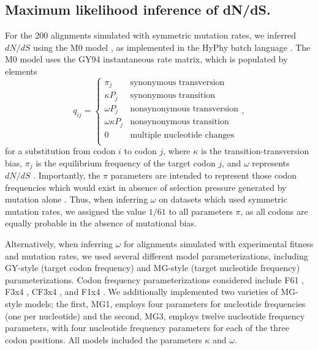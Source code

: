 \documentclass[11pt]{article}
\begin{document}
\subsection*{Maximum likelihood inference of dN/dS.}
For the 200 alignments simulated with symmetric mutation rates, we inferred $dN/dS$ using the M0 model \cite{Yangetal2000}, as implemented in the HyPhy batch language \cite{KosakovskyPondetal2005}. The M0 model uses the GY94 instantaneous rate matrix, which is populated by elements
\begin{equation}\label{eq:GY94}
q_{ij} = \left\{ 
	\begin{array}{rl}
	\pi_j                &\mbox{synonymous transversion} \\
	\kappa P_j           &\mbox{synonymous transition} \\
 	\omega P_j           &\mbox{nonsynonymous transversion} \\
 	\omega \kappa P_j    &\mbox{nonsynonymous transition} \\
	0                    &\mbox{multiple nucleotide changes} \\             
	\end{array} \right.,
\end{equation} for a substitution from codon $i$ to codon $j$, where $\kappa$ is the transition-transversion bias, $\pi_j$ is the equilibrium frequency of the target codon $j$, and $\omega$ represents $dN/dS$ \cite{GoldmanYang1994,NielsenYang1998}. Importantly, the $\pi$ parameters are intended to represent those codon frequencies which would exist in absence of selection pressure generated by mutation alone \cite{GoldmanYang1994,MuseGaut1994,YN00,Yang2006}. Thus, when inferring $\omega$ on datasets which used symmetric mutation rates, we assigned the value $1/61$ to all parameters $\pi$, as all codons are  equally probable in the absence of mutational bias.

Alternatively, when inferring $\omega$ for alignments simulated with experimental fitness and mutation rates, we used several different model parameterizations, including GY-style \cite{GoldmanYang1994} (target codon frequency) and MG-style \cite{MuseGaut1994} (target nucleotide frequency) parameterizations. Codon frequency parameterizations considered include F61 \cite{GoldmanYang1994}, F3x4 \cite{GoldmanYang1994}, CF3x4 \cite{KosakovskyPond2010}, and F1x4 \cite{MuseGaut1994}. We additionally implemented two varieties of MG-style models; the first, MG1, employs four parameters for nucleotide frequencies (one per nucleotide) and the second, MG3, employs twelve nucleotide frequency parameters, with four nucleotide frequency parameters for each of the three codon positions. All models included the parameters $\kappa$ and $\omega$. 
\end{document}
